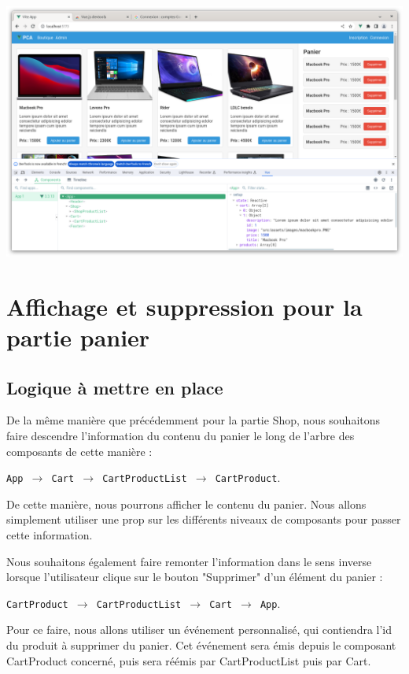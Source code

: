 \begin{center}
\includegraphics[width=15cm]{images/image21.png}
\end{center}


\section{Affichage et suppression pour la partie panier}
\subsection{Logique à mettre en place}
De la même manière que précédemment pour la partie {\color{monOrange}Shop}, nous souhaitons faire descendre l'information du contenu du panier le long de l'arbre des composants de cette manière :
\begin{center}
{\tt App $\to$ Cart $\to$ CartProductList $\to$ CartProduct}.
\end{center}
De cette manière, nous pourrons afficher le contenu du panier. Nous allons simplement utiliser une {\color{monOrange}prop} sur les différents niveaux de composants pour passer cette information.

Nous souhaitons également faire remonter l'information dans le sens inverse lorsque l'utilisateur clique sur le bouton "Supprimer" d'un élément du panier :

\begin{center}
{\tt CartProduct $\to$ CartProductList $\to$ Cart $\to$ App}.
\end{center}
Pour ce faire, nous allons utiliser un événement personnalisé, qui contiendra l'{\color{monOrange}id} du produit à supprimer du panier. Cet événement sera émis depuis le composant {\color{monOrange}CartProduct} concerné, puis sera réémis par {\color{monOrange}CartProductList} puis par {\color{monOrange}Cart}.

